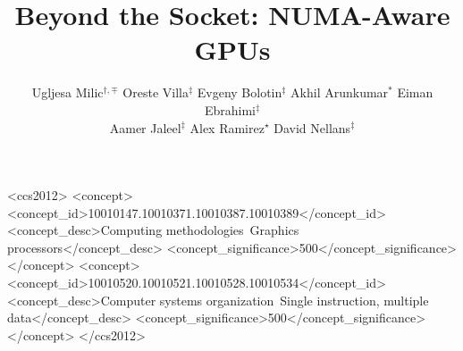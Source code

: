 \documentclass[sigconf]{acmart}
\begin{document}


\newcommand*\circled[1]{\tikz[baseline=(char.base)]{
  \node[shape=circle,draw,inner sep=1pt] (char) {#1};}}

\title{Beyond the Socket: NUMA-Aware GPUs}

\author{Ugljesa Milic$^{\dagger,\mp}$ \hspace{0.2cm} Oreste Villa$^{\ddagger}$ \hspace{0.2cm} Evgeny Bolotin$^{\ddagger}$ \hspace{0.2cm} Akhil Arunkumar$^{\ast}$ \hspace{0.2cm} Eiman Ebrahimi$^{\ddagger}$ \\ Aamer Jaleel$^{\ddagger}$ \hspace{0.2cm} Alex Ramirez$^{\star}$ \hspace{0.2cm} David Nellans$^{\ddagger}$ \vspace{0.25cm}}





\renewcommand{\shortauthors}{U. Milic et al.}



%
%
\begin{CCSXML}
	<ccs2012>
	<concept>
	<concept_id>10010147.10010371.10010387.10010389</concept_id>
	<concept_desc>Computing methodologies~Graphics processors</concept_desc>
	<concept_significance>500</concept_significance>
	</concept>
	<concept>
	<concept_id>10010520.10010521.10010528.10010534</concept_id>
	<concept_desc>Computer systems organization~Single instruction, multiple data</concept_desc>
	<concept_significance>500</concept_significance>
	</concept>
	</ccs2012>
\end{CCSXML}
\end{document}
